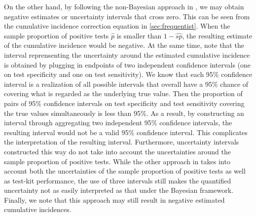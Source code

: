 On the other hand, by following the non-Bayesian approach in \cite{meyer2022adjusting}, we may obtain negative estimates or uncertainty intervals that cross zero. This can be seen from the cumulative incidence correction equation in \cref{sec:frequentist}. When the sample proportion of positive tests $\hat{p}$ is smaller than $1-\hat{sp}$, the resulting estimate of the cumulative incidence would be negative. At the same time, note that the interval reprensenting the uncertainty around the estimated cumulative incidence is obtained by plugging in endpoints of two independent confidence intervals (one on test specificity and one on test sensitivity). We know that each 95\% confidence interval is a realization of all possible intervals that overall have a 95\% chance of covering what is regarded as the underlying true value. Then the proportion of pairs of 95\% confidence intervals on test specificity and test sensitivity covering the true values simultaneously is less than 95\%. As a result, by constructing an interval through aggregating two independent 95\% confidence intervals, the resulting interval would not be a valid 95\% confidence interval. This complicates the interpretation of the resulting interval. Furthermore, uncertainty intervals constructed this way do not take into account the uncertainties around the sample proportion of positive tests. While the other approach in \cite{rosenberg2020cumulative} takes into account both the uncertainties of the sample proportion of positive tests as well as test-kit performance, the use of three intervals still makes the quantified uncertainty not as easily interpreted as that under the Bayesian framework. Finally, we note that this approach may still result in negative estimated cumulative incidences.

